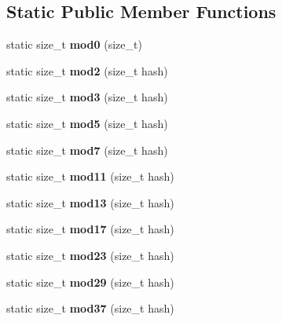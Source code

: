 \subsection*{Static Public Member Functions}
\begin{DoxyCompactItemize}
\item 
static size\+\_\+t {\bfseries mod0} (size\+\_\+t)\label{structska_1_1prime__number__hash__policy_a1fb36bb689ba60d13aa22bebc11981b3}

\item 
static size\+\_\+t {\bfseries mod2} (size\+\_\+t hash)\label{structska_1_1prime__number__hash__policy_a536a0b1fb60552e5ac663ab297545fef}

\item 
static size\+\_\+t {\bfseries mod3} (size\+\_\+t hash)\label{structska_1_1prime__number__hash__policy_a15277115155734a5be6682722945cb71}

\item 
static size\+\_\+t {\bfseries mod5} (size\+\_\+t hash)\label{structska_1_1prime__number__hash__policy_a4ac36e6d414043b4aaf25ed1ae59ad0e}

\item 
static size\+\_\+t {\bfseries mod7} (size\+\_\+t hash)\label{structska_1_1prime__number__hash__policy_a988650288dd42b5cbb037767b3ca0b5c}

\item 
static size\+\_\+t {\bfseries mod11} (size\+\_\+t hash)\label{structska_1_1prime__number__hash__policy_a23aed78772f573194dd6b228d2beb738}

\item 
static size\+\_\+t {\bfseries mod13} (size\+\_\+t hash)\label{structska_1_1prime__number__hash__policy_a2de51f11b798fb102f0a5efc469d012d}

\item 
static size\+\_\+t {\bfseries mod17} (size\+\_\+t hash)\label{structska_1_1prime__number__hash__policy_a8183640d818c1a6458950e1ca01b396d}

\item 
static size\+\_\+t {\bfseries mod23} (size\+\_\+t hash)\label{structska_1_1prime__number__hash__policy_a98e3e7fd2cdc181105e02d4792ec8e55}

\item 
static size\+\_\+t {\bfseries mod29} (size\+\_\+t hash)\label{structska_1_1prime__number__hash__policy_a56281c42d12b6552bf0ddbb5f578ec97}

\item 
static size\+\_\+t {\bfseries mod37} (size\+\_\+t hash)\label{structska_1_1prime__number__hash__policy_a311811627df3acb8d57deb8ea306f027}


\end{DoxyCompactItemize}
